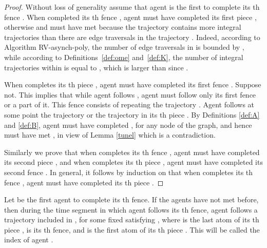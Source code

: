 \documentclass [11pt] {article}
\begin{document}
\begin{proof}
Without loss of generality assume that agent  is the first to complete its th fence 
. When  completed its th fence , agent  must have completed its first piece , otherwise  and  must have met because the trajectory  contains more integral trajectories  than there are {edge traversals} in the trajectory . Indeed, according to Algorithm RV-asynch-poly, the number of {edge traversals} in  is bounded by , while according to Definitions~\ref{def:ome} and~\ref{def:K}, the number of integral trajectories  within  is equal to {}, which is larger than  since . 


When  completes its th piece , agent  must have completed its first fence . Suppose not. This implies
that  while agent  follows , agent  must follow
only its first fence  or a part of it. This fence consists of repeating the trajectory
. Agent  follows at some point the trajectory 
or the trajectory  in its th piece .
By Definitions \ref{def:A} and \ref{def:B}, agent  must have completed , for any node  of the graph,
and hence must have met , in view of Lemma \ref{tunel} which is a contradiction.

Similarly we prove that when  completes its th fence , agent  must have completed its second piece ,
and when  completes its th piece , agent  must have completed its second fence . 
In general, it follows by induction on  that when  completes its th fence , agent  must have completed its th piece .
\end{proof}



\begin{lemma}
\label{claim1}
Let  be the first agent to complete its th fence. If the agents have not met before, then during the time segment in which agent  follows its
th fence, agent  follows a trajectory included in {}, for some fixed  satisfying , where {} is the last atom of its th piece ,  is its th fence,
and {} is the first atom of its th piece .
This  will be called the index of agent .
\end{lemma}
\end{document}
